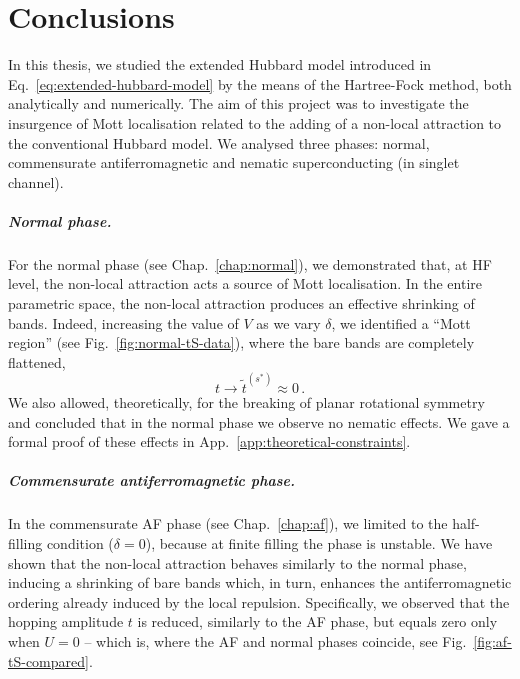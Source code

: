 \chapter{Conclusions}\label{chap:conclusions}

In this thesis, we studied the extended Hubbard model introduced in Eq.~\eqref{eq:extended-hubbard-model} by the means of the Hartree-Fock method, both analytically and numerically. The aim of this project was to investigate the insurgence of Mott localisation related to the adding of a non-local attraction to the conventional Hubbard model. We analysed three phases: normal, commensurate antiferromagnetic and nematic superconducting (in singlet channel).

\paragraph{Normal phase.}

For the normal phase (see Chap.~\ref{chap:normal}), we demonstrated that, at HF level, the non-local attraction acts a source of Mott localisation. In the entire parametric space, the non-local attraction produces an effective shrinking of bands. Indeed, increasing the value of $V$ as we vary $\delta$, we identified a ``Mott region'' (see Fig.~\ref{fig:normal-tS-data}), where the bare bands are completely flattened,
\[
	t \to \tilde{t}^{(s^*)} \approx 0 \, .
\]
We also allowed, theoretically, for the breaking of planar rotational symmetry and concluded that in the normal phase we observe no nematic effects. We gave a formal proof of these effects in App.~\ref{app:theoretical-constraints}.

\paragraph{Commensurate antiferromagnetic phase.}

In the commensurate AF phase (see Chap.~\ref{chap:af}), we limited to the half-filling condition ($\delta=0$), because at finite filling the phase is unstable. We have shown that the non-local attraction behaves similarly to the normal phase, inducing a shrinking of bare bands which, in turn, enhances the antiferromagnetic ordering already induced by the local repulsion. Specifically, we observed that the hopping amplitude $t$ is reduced, similarly to the AF phase, but equals zero only when $U=0$ -- which is, where the AF and normal phases coincide, see Fig.~\ref{fig:af-tS-compared}.

